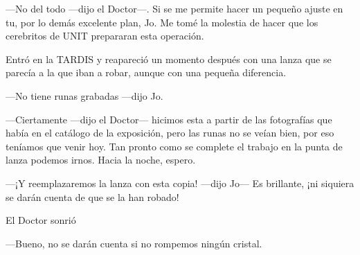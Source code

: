 ---No del todo ---dijo el Doctor---. Si se me permite hacer un pequeño
ajuste en tu, por lo demás excelente plan, Jo. Me tomé la molestia de
hacer que los cerebritos de UNIT prepararan esta operación.

Entró en la TARDIS y reapareció un momento después con una lanza que se
parecía a la que iban a robar, aunque con una pequeña diferencia.

---No tiene runas grabadas ---dijo Jo.

---Ciertamente ---dijo el Doctor--- hicimos esta a partir de las
fotografías que había en el catálogo de la exposición, pero las runas no
se veían bien, por eso teníamos que venir hoy. Tan pronto como se
complete el trabajo en la punta de lanza podemos irnos. Hacia la noche,
espero.

---¡Y reemplazaremos la lanza con esta copia! ---dijo Jo--- Es
brillante, ¡ni siquiera se darán cuenta de que se la han robado!

El Doctor sonrió

---Bueno, no se darán cuenta si no rompemos ningún cristal.